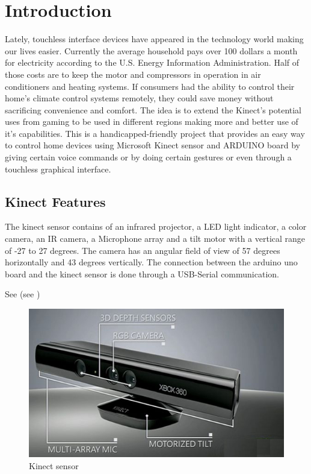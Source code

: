 \chapter{Introduction}

Lately, touchless interface devices have appeared in the technology world making our lives easier. Currently the average household pays over 100 dollars a month for electricity according to the U.S. Energy Information Administration. Half of those costs are to keep the motor and compressors in operation in air conditioners and heating systems. If consumers had the ability to control their home’s climate control systems remotely, they could save money without sacrificing convenience and comfort.
The idea is to extend the Kinect's potential uses from gaming to be used in different regions making more and better use of it's capabilities. This is a handicapped-friendly project that provides an easy way to control home devices using Microsoft Kinect sensor and ARDUINO board by giving certain voice commands or by doing certain gestures or even through a touchless graphical interface.


\section{Kinect Features}

The kinect sensor contains of an infrared projector, a LED light indicator, a color camera, an IR camera, a Microphone array and a tilt motor with a vertical range of -27 to 27 degrees.
The camera has an angular field of view of 57 degrees horizontally and 43 degrees vertically.
The connection between the arduino uno board and the kinect sensor is done through a USB-Serial communication.

See  (see )


\begin{figure}[tbp]
  \centering
  \includegraphics[width=.5\linewidth]{KinectSensor.jpg}
  \caption{Kinect sensor}
  \label{fig:kinectsensor}
\end{figure}
  
